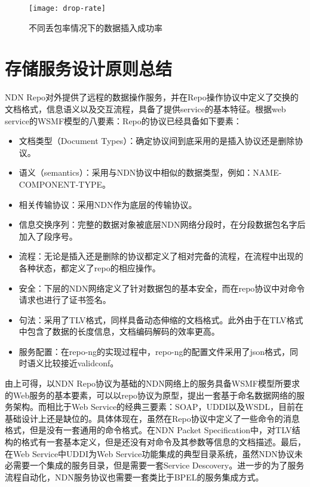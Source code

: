 \begin{figure}[H]
  \centering
  \texttt{[image: drop-rate]}
  \caption{不同丢包率情况下的数据插入成功率}
  \label{fig:drop-rate}
\end{figure}

\section{存储服务设计原则总结}
NDN Repo对外提供了远程的数据操作服务，并在Repo操作协议中定义了交换的文档格式，信息语义以及交互流程，具备了提供service的基本特征。根据web service的WSMF模型的八要素：Repo的协议已经具备如下要素：

\begin{itemize}
\item 文档类型（Document Types）：确定协议间到底采用的是插入协议还是删除协议。
\item 语义（semantics）：采用与NDN协议中相似的数据类型，例如：NAME-COMPONENT-TYPE。
\item 相关传输协议：采用NDN作为底层的传输协议。
\item 信息交换序列：完整的数据对象被底层NDN网络分段时，在分段数据包名字后加入了段序号。
\item 流程：无论是插入还是删除的协议都定义了相对完备的流程，在流程中出现的各种状态，都定义了repo的相应操作。
\item 安全：下层的NDN网络定义了针对数据包的基本安全，而在repo协议中对命令请求也进行了证书签名。
\item 句法：采用了TLV格式，同样具备动态伸缩的文档格式。此外由于在TLV格式中包含了数据的长度信息，文档编码解码的效率更高。
\item 服务配置：在repo-ng的实现过程中，repo-ng的配置文件采用了json格式，同时语义比较接近validconf。
\end{itemize}

由上可得，以NDN Repo协议为基础的NDN网络上的服务具备WSMF模型所要求的Web服务的基本要素，可以以repo协议为原型，提出一套基于命名数据网络的服务架构。而相比于Web Service的经典三要素：SOAP，UDDI以及WSDL，目前在基础设计上还是缺位的。具体体现在，虽然在Repo协议中定义了一些命令的消息格式，但是没有一套通用的命令格式。在NDN Packet Specification中，对TLV结构的格式有一套基本定义，但是还没有对命令及其参数等信息的文档描述。最后，在Web Service中UDDI为Web Service功能集成的典型目录系统，虽然NDN协议未必需要一个集成的服务目录，但是需要一套Service Descovery。进一步的为了服务流程自动化，NDN服务协议也需要一套类比于BPEL的服务集成方式。